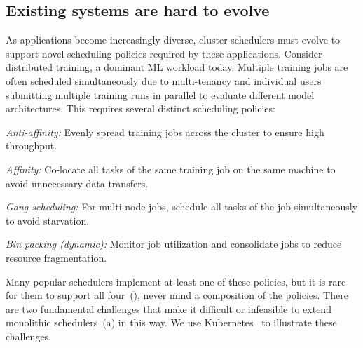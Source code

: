 

\subsection{Existing systems are hard to evolve}
\label{sec:escher_motivation:example}

As applications become increasingly diverse, cluster schedulers must evolve to support novel scheduling policies required by these applications. Consider distributed training, a dominant ML workload today. 
Multiple training jobs are often scheduled simultaneously due to multi-tenancy and individual users submitting multiple training runs in parallel to evaluate different model architectures.
This requires several distinct scheduling policies: %
\begin{compactitem}
\item \emph{Anti-affinity:} Evenly spread training jobs across the cluster to ensure high throughput.
\item \emph{Affinity:} Co-locate all tasks of the same training job on the same machine to avoid unnecessary data transfers.
\item \emph{Gang scheduling:} For multi-node jobs, schedule all tasks of the job simultaneously to avoid starvation.
\item \emph{Bin packing (dynamic):} Monitor job utilization and consolidate jobs to reduce resource fragmentation. %
\end{compactitem}

Many popular schedulers implement at least one of these policies, but it is rare for them to support all four~(), never mind a composition of the policies.
There are two fundamental challenges that make it difficult or infeasible to extend monolithic schedulers~(a) in this way.
We use Kubernetes~\cite{kubernetes} to illustrate these challenges. %
% 

